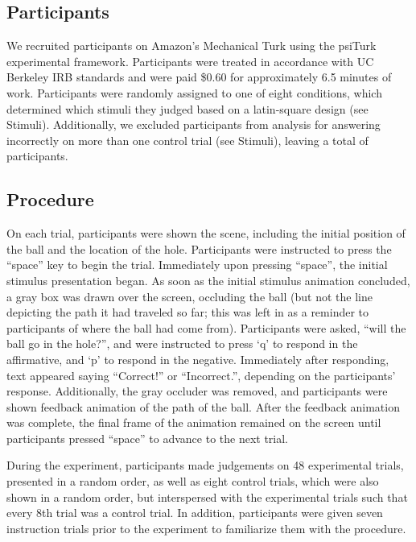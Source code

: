 \documentclass[10pt,letterpaper]{article}
\begin{document}
\subsection{Participants}

We recruited \HoleNumComplete{} participants on Amazon's Mechanical Turk using the psiTurk \cite{McDonnell12} experimental framework.
Participants were treated in accordance with UC Berkeley IRB standards and were paid \$0.60 for approximately 6.5 minutes of work.
Participants were randomly assigned to one of eight conditions, which determined which stimuli they judged based on a latin-square design (see Stimuli). 
Additionally, we excluded \HoleNumFailed{} participants from analysis for answering incorrectly on more than one control trial (see Stimuli), leaving a total of \HoleNumOk{} participants.

\subsection{Procedure}

On each trial, participants were shown the scene, including the initial position of the ball and the location of the hole. 
Participants were instructed to press the ``space'' key to begin the trial. 
Immediately upon pressing ``space'', the initial stimulus presentation began. 
As soon as the initial stimulus animation concluded, a gray box was drawn over the screen, occluding the ball (but not the line depicting the path it had traveled so far; this was left in as a reminder to participants of where the ball had come from). 
Participants were asked, ``will the ball go in the hole?'', and were instructed to press `q' to respond in the affirmative, and `p' to respond in the negative. 
Immediately after responding, text appeared saying ``Correct!'' or ``Incorrect.'', depending on the participants' response.
Additionally, the gray occluder was removed, and participants were shown feedback animation of the path of the ball.
After the feedback animation was complete, the final frame of the animation remained on the screen until participants pressed ``space'' to advance to the next trial.

During the experiment, participants made judgements on 48 experimental trials, presented in a random order, as well as eight control trials, which were also shown in a random order, but interspersed with the experimental trials such that every 8th trial was a control trial.
In addition, participants were given seven instruction trials prior to the experiment to familiarize them with the procedure.
\end{document}
